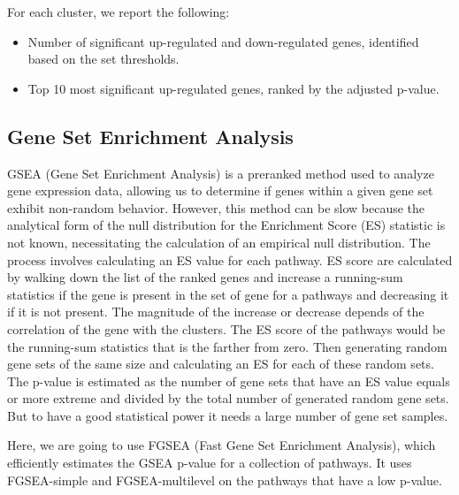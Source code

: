\documentclass[a4paper, 11pt]{article}
\begin{document}
\begin{multicols}{2}
For each cluster, we report the following:
\begin{itemize}
    \item Number of significant up-regulated and down-regulated genes, identified based on the set thresholds.
    \item Top 10 most significant up-regulated genes, ranked by the adjusted p-value.
\end{itemize}

\subsection{Gene Set Enrichment Analysis}
GSEA (Gene Set Enrichment Analysis) is a preranked method used to analyze gene expression data, allowing us to determine if genes within a given gene set exhibit non-random behavior. However, this method can be slow because the analytical form of the null distribution for the Enrichment Score (ES) statistic is not known, necessitating the calculation of an empirical null distribution.
The process involves calculating an ES value for each pathway. ES score are calculated by walking down the list of the ranked genes and increase a running-sum statistics if the gene is present in the set of gene for  a pathways and decreasing it if it is not present\citep{GSEA}. The magnitude of the increase or decrease  depends of the correlation of the gene with the clusters. The ES score of the pathways would be the running-sum statistics that is the farther from zero. 
Then generating random gene sets of the same size and calculating an ES for each of these random sets. The p-value is estimated as the number of gene sets that have an ES value equals or more extreme and divided by the total number of generated random gene sets. But to have a good statistical power it needs a large number of gene set samples.

Here, we are going to use FGSEA (Fast Gene Set Enrichment Analysis), which efficiently estimates the GSEA p-value for a collection of pathways. It uses FGSEA-simple and FGSEA-multilevel on the pathways that have a low p-value.


\end{multicols}
\end{document}
